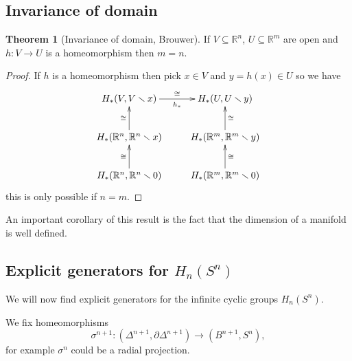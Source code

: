 \documentclass[12pt]{article}
\theoremstyle{definition}
\newtheorem{thm}{Theorem}[subsection]
\theoremstyle{definition}
\newcommand{\RR}{\mathbb{R}}
\renewcommand{\H}{H_*}
\begin{document}
\subsection{Invariance of domain}
\begin{thm}[Invariance of domain, Brouwer]
If $V \subseteq \RR^n$, $U \subseteq \RR^m$ are open and $h\colon V \to U$ is a homeomorphism then $m= n$.
\end{thm}
\begin{proof}
If $h$ is a homeomorphism then pick $x\in V$ and $y = h(x) \in U$ so we have
\[
\xymatrix
{
\H(V,V\smallsetminus x) \ar[r]^{\cong}_{h_*} & \H(U, U\smallsetminus y) \\
\H(\RR^n, \RR^n \smallsetminus x) \ar[u]^{\cong} & \H(\RR^m, \RR^m \smallsetminus y) \ar[u]_{\cong} \\
\H(\RR^n, \RR^n \smallsetminus 0) \ar[u]^{\cong} & \H(\RR^m, \RR^m \smallsetminus 0) \ar[u]_{\cong} \\
}
\]
this is only possible if $n = m$.
\end{proof}
An important corollary of this result is the fact that the dimension of a manifold is well defined.

\subsection{Explicit generators for $H_n(S^n)$}
We will now find explicit generators for the infinite cyclic groups $H_n(S^n)$.

We fix homeomorphisms
\[
\sigma^{n+1}\colon (\Delta^{n+1}, \partial \Delta^{n+1}) \to (B^{n+1}, S^n),
\]
for example $\sigma^n$ could be a radial projection.
\end{document}
